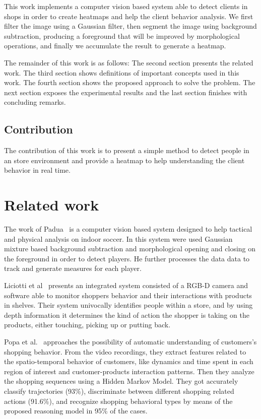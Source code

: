 \documentclass[10pt, conference]{IEEEtran}
\begin{document}
	This work implements a computer vision based system able to detect clients in shops in order to create heatmaps and help the client behavior analysis. We first filter the image using a Gaussian filter, then segment the image using background subtraction, producing a foreground that will be improved by morphological operations, and finally we accumulate the result to generate a heatmap.
	
	The remainder of this work is as follows: The second section presents the related work. The third section shows definitions of important concepts used in this work. The fourth section shows the proposed approach to solve the problem. The next section exposes the experimental results and the last section finishes with concluding remarks.
	
	\subsection{Contribution}
	The contribution of this work is to present a simple method to detect people in an store environment and provide a heatmap to help understanding the client behavior in real time.
	
	\section{Related work}
	The work of Padua~\cite{padua2014sistema} is a computer vision based system designed to help tactical and physical analysis on indoor soccer. In this system were used Gaussian mixture based background subtraction\cite{zivkovic2004improved} and morphological opening and closing\cite{haralick1987image} on the foreground in order to detect players. He further processes the data data to track and generate measures for each player.
	
	Liciotti et al~\cite{liciotti2014shopper} presents an integrated system consisted of a RGB-D camera and software able to monitor shoppers behavior and their interactions with products in shelves. Their system univocally identifies people within a store, and by using depth information it determines the kind of action the shopper is taking on the products, either touching, picking up or putting back.
	
	Popa et al.~\cite{popa2013semantic} approaches the possibility of automatic understanding of customers’s shopping behavior. From the video recordings, they extract features related to the spatio-temporal behavior of customers, like dynamics and time spent in each region of interest and customer-products interaction patterns. Then they analyze the shopping sequences using a Hidden Markov Model. They got accurately classify trajectories (93\%), discriminate between different shopping related actions (91.6\%), and recognize shopping behavioral types by means of the proposed reasoning model in 95\% of the cases.
	
\end{document}
